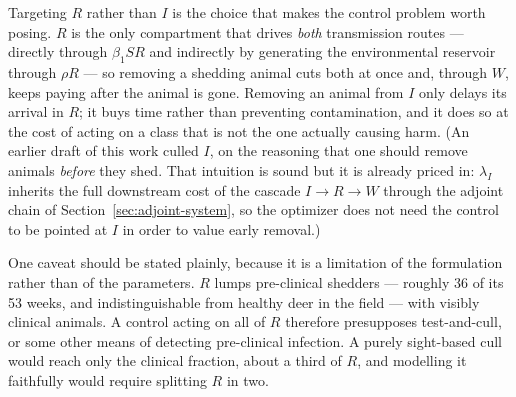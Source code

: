 \documentclass[11pt]{article}
\begin{document}
Targeting $R$ rather than $I$ is the choice that makes the control problem worth posing. $R$ is the only compartment that drives \emph{both} transmission routes --- directly through $\beta_1 SR$ and indirectly by generating the environmental reservoir through $\rho R$ --- so removing a shedding animal cuts both at once and, through $W$, keeps paying after the animal is gone. Removing an animal from $I$ only delays its arrival in $R$; it buys time rather than preventing contamination, and it does so at the cost of acting on a class that is not the one actually causing harm. (An earlier draft of this work culled $I$, on the reasoning that one should remove animals \emph{before} they shed. That intuition is sound but it is already priced in: $\lambda_I$ inherits the full downstream cost of the cascade $I \to R \to W$ through the adjoint chain of Section~\ref{sec:adjoint-system}, so the optimizer does not need the control to be pointed at $I$ in order to value early removal.)

One caveat should be stated plainly, because it is a limitation of the formulation rather than of the parameters. $R$ lumps pre-clinical shedders --- roughly 36 of its 53 weeks, and indistinguishable from healthy deer in the field --- with visibly clinical animals. A control acting on all of $R$ therefore presupposes test-and-cull, or some other means of detecting pre-clinical infection. A purely sight-based cull would reach only the clinical fraction, about a third of $R$, and modelling it faithfully would require splitting $R$ in two.
\end{document}
